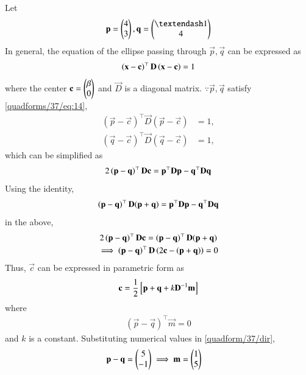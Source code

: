 Let 
\begin{align}
\vec{p} = \myvec{4\\3} , \vec{q} = \myvec{– 1\\4}
\end{align}
%
In general, the equation of the ellipse passing through $\vec{p}, \vec{q}$ can be expressed as
\begin{align}
\left(\mathbf{x}-\mathbf{c}\right)^{\top}\mathbf{D}\left(\mathbf{x}-\mathbf{c}\right)=1\label{quadforms/37/eq:14}
\end{align}
where the center $\mathbf{c}=\begin{pmatrix}\beta\\0\end{pmatrix}$ and 
 $\vec{D}$ is a diagonal matrix.
$\because \vec{p}, \vec{q}$ satisfy \eqref{quadforms/37/eq:14},
\begin{align}
\label{quadforms/37/eq:ellipse_std_ab}
(\vec{p}-\vec{c})^{\top}\vec{D}(\vec{p}-\vec{c}) &= 1,
\\
(\vec{q}-\vec{c})^{\top}\vec{D}(\vec{q}-\vec{c}) &= 1,
\end{align}
which can be simplified as 
\begin{align}
    2\left(\mathbf{p}-\mathbf{q}\right)^{\top}\mathbf{D}\mathbf{c}=\mathbf{p}^{\top}\mathbf{D}\mathbf{p}-\mathbf{q}^{\top}\mathbf{D}\mathbf{q}
\end{align}
Using the identity, 
\begin{multline}
    \left(\mathbf{p}-\mathbf{q}\right)^{\top}\mathbf{D}(\mathbf{p}+\mathbf{q})
   =\mathbf{p}^{\top}\mathbf{D}\mathbf{p}-\mathbf{q}^{\top}\mathbf{D}\mathbf{q}
\end{multline}
in the above, 
\begin{multline}
    2\left(\mathbf{p}-\mathbf{q}\right)^{\top}\mathbf{D}\mathbf{c}  = \left(\mathbf{p}-\mathbf{q}\right)^{\top}\mathbf{D}(\mathbf{p}+\mathbf{q})
    \\
    \implies \left(\mathbf{p}-\mathbf{q}\right)^{\top}\mathbf{D}\left(2\mathbf{c}-\left(\mathbf{p}+\mathbf{q}\right)\right) = 0
\end{multline}
Thus, $\vec{c}$ can be expressed in parametric form as 
\begin{align}
    \mathbf{c}=\frac{1}{2}{}\left[\mathbf{p}+\mathbf{q}+ k\mathbf{D}^{-1}\mathbf{m}\right]
    \label{quadform/37/centre}
    \end{align}
    where 
\begin{align}
    (\vec{p}-\vec{q})^{\top}\vec{m}=0
    \label{quadform/37/dir}
\end{align}
and $k$ is a constant.  Substituting numerical values in     \eqref{quadform/37/dir},
\begin{align}
    \mathbf{p}-\mathbf{q} &= \begin{pmatrix}5 \\ -1\end{pmatrix}
    \implies \mathbf{m} = \begin{pmatrix}1 \\ 5\end{pmatrix}
\end{align}
